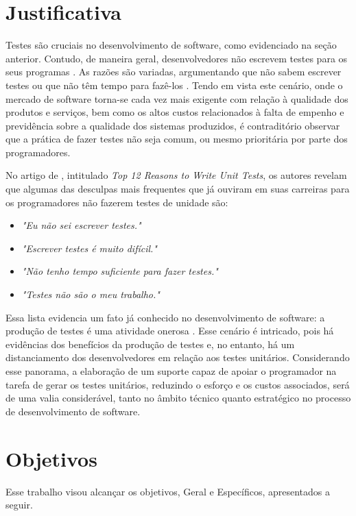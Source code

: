 \section{Justificativa}
Testes são cruciais no desenvolvimento de software, como evidenciado na seção
anterior. Contudo, de maneira geral, desenvolvedores não escrevem testes para
os seus programas \cite{burkeCoyner2003}. As razões são variadas, argumentando
que não sabem escrever testes ou que não têm tempo para fazê-los
\cite{burkeCoyner2003}. Tendo em vista este cenário, onde o mercado de
software torna-se cada vez mais exigente com relação à qualidade dos produtos
e serviços, bem como os altos custos relacionados à falta de empenho e
previdência sobre a qualidade dos sistemas produzidos, é contraditório
observar que a prática de fazer testes não seja comum, ou mesmo prioritária
por parte dos programadores.
\par
\indent No artigo de , intitulado
\textit{Top 12 Reasons to Write Unit Tests}, os autores revelam que algumas das
desculpas mais frequentes que já ouviram em suas carreiras para os
programadores não fazerem testes de unidade são:
  \begin{itemize}
    \item \textit{"Eu não sei escrever testes."}

    \item \textit{"Escrever testes é muito difícil."}

    \item \textit{"Não tenho tempo suficiente para fazer testes."}

    \item \textit{"Testes não são o meu trabalho."}
  \end{itemize}
\par
\indent Essa lista evidencia um fato já conhecido no desenvolvimento de
software: a produção de testes é uma atividade onerosa \cite{barbosaEtAl2009}.
Esse cenário é intricado, pois há evidências dos benefícios da produção de
testes e, no entanto, há um distanciamento dos desenvolvedores em relação aos
testes unitários. Considerando esse panorama, a elaboração de um suporte capaz
de apoiar o programador na tarefa de gerar os testes unitários, reduzindo o
esforço e os custos associados, será de uma valia considerável, tanto no âmbito
técnico quanto estratégico no processo de desenvolvimento de software.


\section{Objetivos}
Esse trabalho visou alcançar os objetivos, Geral e Específicos, apresentados a
seguir.

